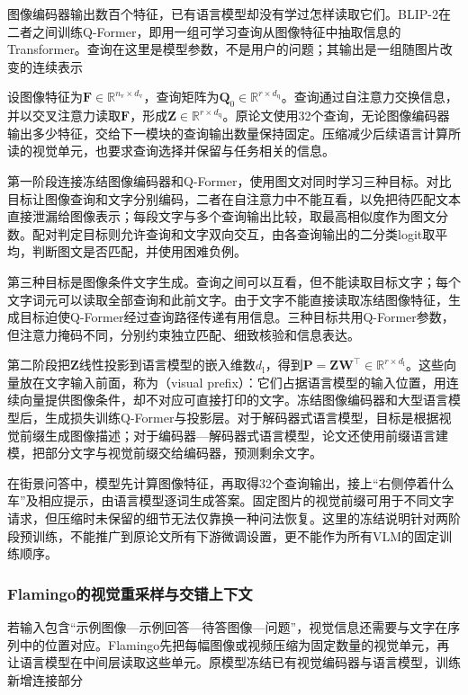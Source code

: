 图像编码器输出数百个特征，已有语言模型却没有学过怎样读取它们。BLIP-2在二者之间训练Q-Former，即用一组可学习查询从图像特征中抽取信息的Transformer。查询在这里是模型参数，不是用户的问题；其输出是一组随图片改变的连续表示

设图像特征为$\bm F\in\mathbb R^{n_{\mathrm v}\times d_{\mathrm v}}$，查询矩阵为$\bm Q_0\in\mathbb R^{r\times d_{\mathrm q}}$。查询通过自注意力交换信息，并以交叉注意力读取$\bm F$，形成$\bm Z\in\mathbb R^{r\times d_{\mathrm q}}$。原论文使用32个查询，无论图像编码器输出多少特征，交给下一模块的查询输出数量保持固定。压缩减少后续语言计算所读的视觉单元，也要求查询选择并保留与任务相关的信息。

第一阶段连接冻结图像编码器和Q-Former，使用图文对同时学习三种目标。对比目标让图像查询和文字分别编码，二者在自注意力中不能互看，以免把待匹配文本直接泄漏给图像表示；每段文字与多个查询输出比较，取最高相似度作为图文分数。配对判定目标则允许查询和文字双向交互，由各查询输出的二分类logit取平均，判断图文是否匹配，并使用困难负例。

第三种目标是图像条件文字生成。查询之间可以互看，但不能读取目标文字；每个文字词元可以读取全部查询和此前文字。由于文字不能直接读取冻结图像特征，生成目标迫使Q-Former经过查询路径传递有用信息。三种目标共用Q-Former参数，但注意力掩码不同，分别约束独立匹配、细致核验和信息表达。

第二阶段把$\bm Z$线性投影到语言模型的嵌入维数$d_{\mathrm l}$，得到$\bm P=\bm Z\bm W^\top\in\mathbb R^{r\times d_{\mathrm l}}$。这些向量放在文字输入前面，称为（visual prefix）：它们占据语言模型的输入位置，用连续向量提供图像条件，却不对应可直接打印的文字。冻结图像编码器和大型语言模型后，生成损失训练Q-Former与投影层。对于解码器式语言模型，目标是根据视觉前缀生成图像描述；对于编码器—解码器式语言模型，论文还使用前缀语言建模，把部分文字与视觉前缀交给编码器，预测剩余文字。

在街景问答中，模型先计算图像特征，再取得32个查询输出，接上“右侧停着什么车”及相应提示，由语言模型逐词生成答案。固定图片的视觉前缀可用于不同文字请求，但压缩时未保留的细节无法仅靠换一种问法恢复。这里的冻结说明针对两阶段预训练，不能推广到原论文所有下游微调设置，更不能作为所有VLM的固定训练顺序。

\subsubsection{Flamingo的视觉重采样与交错上下文}
\label{sec:vision-models-flamingo}

若输入包含“示例图像—示例回答—待答图像—问题”，视觉信息还需要与文字在序列中的位置对应。Flamingo先把每幅图像或视频压缩为固定数量的视觉单元，再让语言模型在中间层读取这些单元。原模型冻结已有视觉编码器与语言模型，训练新增连接部分


